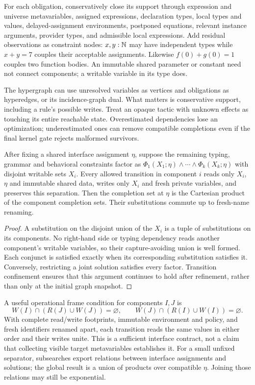 For each obligation, conservatively close its support through expression and
universe metavariables, assigned expressions, declaration types, local types
and values, delayed-assignment environments, postponed equations, relevant
instance arguments, provider types, and admissible local expressions. Add
residual observations as constraint nodes: $x,y:\mathbb{N}$ may have independent
types while $x+y=7$ couples their acceptable assignments. Likewise
$f(0)+g(0)=1$ couples two function bodies. An immutable shared parameter or
constant need not connect components; a writable variable in its type does.

The hypergraph can use unresolved variables as vertices and obligations as
hyperedges, or its incidence-graph dual. What matters is conservative support,
including a rule's possible writes. Treat an opaque tactic with unknown effects
as touching its entire reachable state. Overestimated dependencies lose an
optimization; underestimated ones can remove compatible completions even if
the final kernel gate rejects malformed survivors.

\begin{proposition}
\label{prop:search-factorization}
After fixing a shared interface assignment $\eta$, suppose the remaining
typing, grammar and behavioral constraints factor as
$\Phi_1(X_1;\eta)\land\cdots\land\Phi_k(X_k;\eta)$ with disjoint writable
sets $X_i$. Every allowed transition in component $i$ reads only $X_i$,
$\eta$ and immutable shared data, writes only $X_i$ and fresh private
variables, and preserves this separation. Then the completion set at $\eta$
is the Cartesian product of the component completion sets. Their substitutions
commute up to fresh-name renaming.
\end{proposition}
\begin{proof}
A substitution on the disjoint union of the $X_i$ is a tuple of substitutions
on its components. No right-hand side or typing dependency reads another
component's writable variables, so their capture-avoiding union is well formed.
Each conjunct is satisfied exactly when its corresponding substitution
satisfies it. Conversely, restricting a joint solution satisfies every factor.
Transition confinement ensures that this argument continues to hold after
refinement, rather than only at the initial graph snapshot.
\end{proof}

A useful operational frame condition for components $I,J$ is
\[
 W(I)\cap(R(J)\cup W(J))=\varnothing,\qquad
 W(J)\cap(R(I)\cup W(I))=\varnothing.
\]
With complete read/write footprints, immutable environment and policy, and
fresh identifiers renamed apart, each transition reads the same values in
either order and their writes unite. This is a sufficient interface contract,
not a claim that collecting visible target metavariables establishes it.
For a small unfixed separator, subsearches export relations between interface
assignments and solutions; the global result is a union of products over
compatible $\eta$. Joining those relations may still be exponential.

